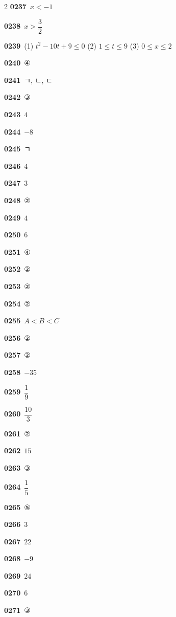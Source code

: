 \documentclass[10pt,a4paper]{article}
\begin{document}
\begin{multicols}{2}
\noindent\textbf{0237}\ $x<-1$\par
\noindent\textbf{0238}\ $x>\dfrac{3}{2}$\par
\noindent\textbf{0239}\ (1) $t^2-10t+9\le 0$ (2) $1\le t\le 9$ (3) $0\le x\le 2$\par
\noindent\textbf{0240}\ ④\par
\noindent\textbf{0241}\ ㄱ, ㄴ, ㄷ\par
\noindent\textbf{0242}\ ③\par
\noindent\textbf{0243}\ $4$\par
\noindent\textbf{0244}\ $-8$\par
\noindent\textbf{0245}\ ㄱ\par
\noindent\textbf{0246}\ $4$\par
\noindent\textbf{0247}\ $3$\par
\noindent\textbf{0248}\ ②\par
\noindent\textbf{0249}\ $4$\par
\noindent\textbf{0250}\ $6$\par
\noindent\textbf{0251}\ ④\par
\noindent\textbf{0252}\ ②\par
\noindent\textbf{0253}\ ②\par
\noindent\textbf{0254}\ ②\par
\noindent\textbf{0255}\ $A<B<C$\par
\noindent\textbf{0256}\ ②\par
\noindent\textbf{0257}\ ②\par
\noindent\textbf{0258}\ $-35$\par
\noindent\textbf{0259}\ $\dfrac{1}{9}$\par
\noindent\textbf{0260}\ $\dfrac{10}{3}$\par
\noindent\textbf{0261}\ ②\par
\noindent\textbf{0262}\ $15$\par
\noindent\textbf{0263}\ ③\par
\noindent\textbf{0264}\ $\dfrac{1}{5}$\par
\noindent\textbf{0265}\ ⑤\par
\noindent\textbf{0266}\ $3$\par
\noindent\textbf{0267}\ $22$\par
\noindent\textbf{0268}\ $-9$\par
\noindent\textbf{0269}\ $24$\par
\noindent\textbf{0270}\ $6$\par
\noindent\textbf{0271}\ ③\par

\end{multicols}
\end{document}
